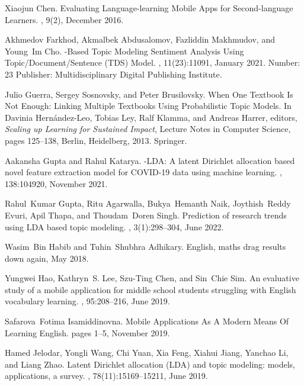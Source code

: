 \begin{thebibliography}{10}
Xiaojun Chen.
\newblock Evaluating {Language}-learning {Mobile} {Apps} for {Second}-language
  {Learners}.
,
  9(2), December 2016.

Akhmedov Farkhod, Akmalbek Abdusalomov, Fazliddin Makhmudov, and Young~Im Cho.
-{Based} {Topic} {Modeling} {Sentiment} {Analysis} {Using}
  {Topic}/{Document}/{Sentence} ({TDS}) {Model}.
, 11(23):11091, January 2021.
\newblock Number: 23 Publisher: Multidisciplinary Digital Publishing Institute.

Julio Guerra, Sergey Sosnovsky, and Peter Brusilovsky.
\newblock When {One} {Textbook} {Is} {Not} {Enough}: {Linking} {Multiple}
  {Textbooks} {Using} {Probabilistic} {Topic} {Models}.
\newblock In Davinia Hernández-Leo, Tobias Ley, Ralf Klamma, and Andreas
  Harrer, editors, {\em Scaling up {Learning} for {Sustained} {Impact}},
  Lecture {Notes} in {Computer} {Science}, pages 125--138, Berlin, Heidelberg,
  2013. Springer.

Aakansha Gupta and Rahul Katarya.
-{LDA}: {A} latent {Dirichlet} allocation based novel feature
  extraction model for {COVID}-19 data using machine learning.
, 138:104920, November 2021.

Rahul~Kumar Gupta, Ritu Agarwalla, Bukya~Hemanth Naik, Joythish~Reddy Evuri,
  Apil Thapa, and Thoudam~Doren Singh.
\newblock Prediction of research trends using {LDA} based topic modeling.
, 3(1):298--304, June 2022.

Wasim~Bin Habib and Tuhin~Shubhra Adhikary.
\newblock English, maths drag results down again, May 2018.

Yungwei Hao, Kathryn~S. Lee, Szu-Ting Chen, and Sin~Chie Sim.
\newblock An evaluative study of a mobile application for middle school
  students struggling with {English} vocabulary learning.
, 95:208--216, June 2019.

Safarova~Fotima Isamiddinovna.
\newblock Mobile {Applications} {As} {A} {Modern} {Means} {Of} {Learning}
  {English}.
\newblock pages 1--5, November 2019.

Hamed Jelodar, Yongli Wang, Chi Yuan, Xia Feng, Xiahui Jiang, Yanchao Li, and
  Liang Zhao.
\newblock Latent {Dirichlet} allocation ({LDA}) and topic modeling: models,
  applications, a survey.
, 78(11):15169--15211, June
  2019.


\end{thebibliography}

